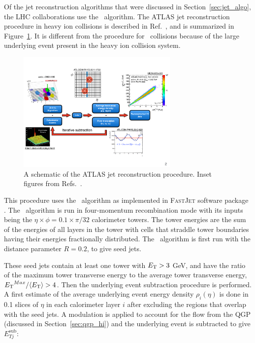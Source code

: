 Of the jet reconstruction algorithms that were discussed in Section~\ref{sec:jet_algo}, the LHC collaborations use the \antikt\ algorithm.
The ATLAS jet reconstruction procedure in heavy ion collisions is described in Ref.~\cite{2019108}, and is summarized in Figure~\ref{fig:atlasHIjetreco}.
It is different from the procedure for \pp\ collisions because of the large underlying event present in the heavy ion collision system.

\begin{figure}[htbp!]
	\centering
	\includegraphics[width=0.7\textwidth]{figures/setup/atlasHIjetReco} %
	\caption{A schematic of the ATLAS jet reconstruction procedure.
	Inset figures from Refs.~\cite{Cacciari:2008gp, atlasRun1EventDisplay, ATLAS-COM-PHYS-2011-1733, Cole:1450219, perfPlots}.}	
	\label{fig:atlasHIjetreco}%
\end{figure}

This procedure uses the \antikt\ algorithm as implemented in \textsc{FastJet} software package \cite{fastjet_algo}.
The \antikt\ algorithm is run in four-momentum recombination mode with its inputs being the $\eta \times \phi = 0.1 \times \pi / 32$ calorimeter towers.
The tower energies are the sum of the energies of all layers in the tower with cells that straddle tower boundaries having their energies fractionally distributed.
The \antikt\ algorithm is first run with the distance parameter $R=0.2$, to give seed jets.

These seed jets contain at least one tower with $\mbox{$E_{\mathrm{T}}$} > 3$ GeV, and have the ratio of the maximum tower transverse energy to the average tower transverse energy, $\mbox{$E_{\mathrm{T}}$}^{Max} / \langle \mbox{$E_{\mathrm{T}}$} \rangle > 4$.
Then the underlying event subtraction procedure is performed.
A first estimate of the average underlying event energy density $\rho_i (\eta)$ is done in 0.1 slices of $\eta$ in each calorimeter layer $i$ after excluding the regions that overlap with the seed jets.
A modulation is applied to account for the flow from the QGP (discussed in Section~\ref{sec:qgp_hi}) and the underlying event is subtracted to give $E_{Tj}^{\mathrm{sub}}$:

